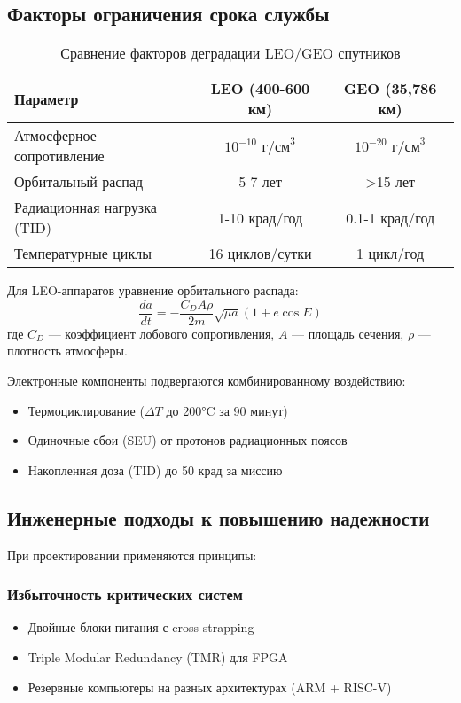 \subsection{Факторы ограничения срока службы}
\begin{table}[h]
	\centering
	\caption{Сравнение факторов деградации LEO/GEO спутников}
	\begin{tabular}{|l|c|c|}
		\hline
		Параметр                    & LEO (400-600 км)           & GEO (35,786 км)            \\
		\hline
		Атмосферное сопротивление   & $10^{-10}$ $\text{г/см}^3$ & $10^{-20}$ $\text{г/см}^3$ \\
		Орбитальный распад          & 5-7 лет                    & >15 лет                    \\
		Радиационная нагрузка (TID) & 1-10 крад/год              & 0.1-1 крад/год             \\
		Температурные циклы         & 16 циклов/сутки            & 1 цикл/год                 \\
		\hline
	\end{tabular}
\end{table}

Для LEO-аппаратов уравнение орбитального распада:
\begin{equation}
	\frac{da}{dt} = -\frac{C_D A \rho}{2m} \sqrt{\mu a}(1 + e\cos E)
\end{equation}
где $C_D$  — коэффициент лобового сопротивления, $A$ — площадь сечения, $\rho$ — плотность атмосферы.

Электронные компоненты подвергаются комбинированному воздействию:
\begin{itemize}
	\item Термоциклирование ($\Delta T$ до 200°C за 90 минут)
	\item Одиночные сбои (SEU) от протонов радиационных поясов
	\item Накопленная доза (TID) до 50 крад за миссию
\end{itemize}

\subsection{Инженерные подходы к повышению надежности}
При проектировании применяются принципы:

\subsubsection{Избыточность критических систем}
\begin{itemize}
	\item Двойные блоки питания с cross-strapping
	\item Triple Modular Redundancy (TMR) для FPGA
	\item Резервные компьютеры на разных архитектурах (ARM + RISC-V)
\end{itemize}

